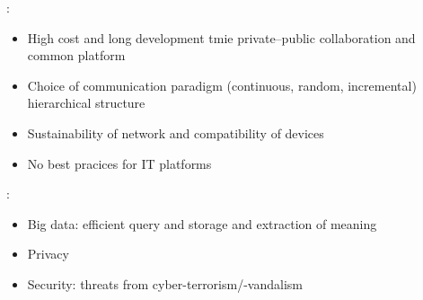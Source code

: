 \documentclass[]{scrartcl}
\begin{document}
\cite[p.~2~ff.]{Ahmed.2018}:
\begin{itemize}
	\item High cost and long development tmie \textrightarrow private--public collaboration and common platform
	\item Choice of communication paradigm (continuous, random, incremental) \textrightarrow hierarchical structure
	\item Sustainability of network and compatibility of devices
	\item No best pracices for IT platforms
\end{itemize}

\cite[p.~9~f.]{Petrolo.2017}:
\begin{itemize}
	\item Big data: efficient query and storage and extraction of meaning
	\item Privacy
	\item Security: threats from cyber-terrorism/-vandalism
\end{itemize}


\printbibliography
\end{document}
